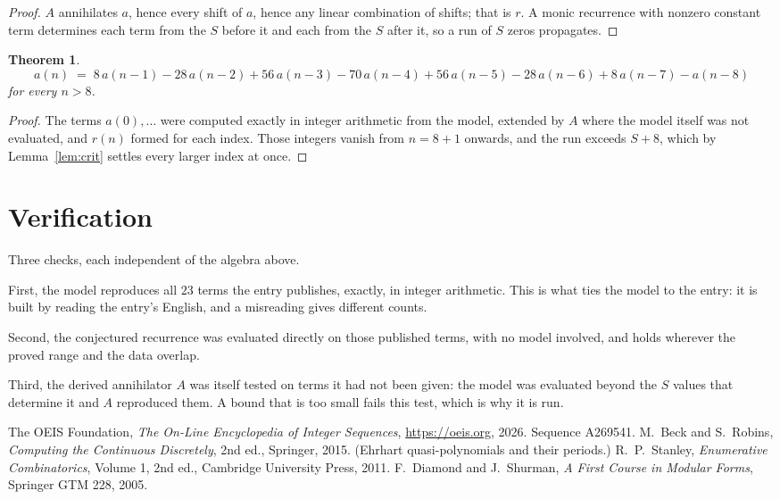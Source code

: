 \documentclass[11pt,a4paper]{article}
\theoremstyle{plain}
\newtheorem{theorem}{Theorem}
\theoremstyle{definition}
\begin{document}
\begin{proof}
$A$ annihilates $a$, hence every shift of $a$, hence any linear combination of shifts; that is
$r$. A monic recurrence with nonzero constant term determines each term from the $S$ before it
and each from the $S$ after it, so a run of $S$ zeros propagates.
\end{proof}

\begin{theorem}
\[
a(n)\;=\;8\,a(n-1) - 28\,a(n-2) + 56\,a(n-3) - 70\,a(n-4) + 56\,a(n-5) - 28\,a(n-6) + 8\,a(n-7) - a(n-8)
\]
for every $n>8$.
\end{theorem}

\begin{proof}
The terms $a(0),\dots$ were computed exactly in integer arithmetic from the model, extended by
$A$ where the model itself was not evaluated, and $r(n)$ formed for each index. Those integers
vanish from $n=8+1$ onwards, and the run exceeds $S+8$, which by
Lemma~\ref{lem:crit} settles every larger index at once.
\end{proof}

\section{Verification}

Three checks, each independent of the algebra above.

First, the model reproduces all $23$ terms the entry publishes, exactly, in integer
arithmetic. This is what ties the model to the entry: it is built by reading the entry's
English, and a misreading gives different counts.

Second, the conjectured recurrence was evaluated directly on those published terms, with no
model involved, and holds wherever the proved range and the data overlap.

Third, the derived annihilator $A$ was itself tested on terms it had not been given: the model
was evaluated beyond the $S$ values that determine it and $A$ reproduced them. A bound that is
too small fails this test, which is why it is run.

\begin{thebibliography}{9}
 The OEIS Foundation, \emph{The On-Line Encyclopedia of Integer
Sequences}, \url{https://oeis.org}, 2026. Sequence A269541.
 M.~Beck and S.~Robins, \emph{Computing the Continuous Discretely},
2nd ed., Springer, 2015. (Ehrhart quasi-polynomials and their periods.)
 R.~P.~Stanley, \emph{Enumerative Combinatorics}, Volume 1, 2nd ed.,
Cambridge University Press, 2011.
 F.~Diamond and J.~Shurman, \emph{A First Course in Modular Forms},
Springer GTM 228, 2005.
\end{thebibliography}
\end{document}

